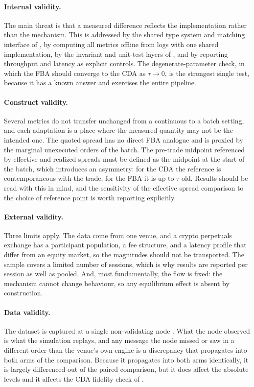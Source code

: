 \paragraph{Internal validity.} The main threat is that a measured
difference reflects the implementation rather than the mechanism. This
is addressed by the shared type system and matching interface of
, by computing all metrics offline from logs with one
shared implementation, by the invariant and unit-test layers of
, and by reporting throughput and latency as
explicit controls. The degenerate-parameter check, in which the FBA
should converge to the CDA as $\tau \to 0$, is the strongest single
test, because it has a known answer and exercises the entire pipeline.

\paragraph{Construct validity.} Several metrics do not transfer
unchanged from a continuous to a batch setting, and each adaptation is a
place where the measured quantity may not be the intended one. The
quoted spread has no direct FBA analogue and is proxied by the marginal
unexecuted orders of the batch. The pre-trade midpoint referenced by
effective and realized spreads must be defined as the midpoint at the
start of the batch, which introduces an asymmetry: for the CDA the
reference is contemporaneous with the trade, for the FBA it is up to
$\tau$ old. Results should be read with this in mind, and the
sensitivity of the effective spread comparison to the choice of
reference point is worth reporting explicitly.

\paragraph{External validity.} Three limits apply. The data come from
one venue, and a crypto perpetuals exchange has a participant
population, a fee structure, and a latency profile that differ from an
equity market, so the magnitudes should not be transported. The sample
covers a limited number of sessions, which is why results are reported
per session as well as pooled. And, most fundamentally, the flow is
fixed: the mechanism cannot change behaviour, so any equilibrium effect
is absent by construction.

\paragraph{Data validity.} The dataset is captured at a single
non-validating node \citep{albers2026openbook}. What the node observed
is what the simulation replays, and any message the node missed or saw
in a different order than the venue's own engine is a discrepancy that
propagates into both arms of the comparison. Because it propagates into
both arms identically, it is largely differenced out of the paired
comparison, but it does affect the absolute levels and it affects the
CDA fidelity check of .
